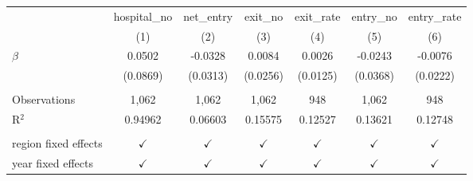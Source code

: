 \begingroup
\centering
\begin{tabular}{lcccccc}
   \toprule
                        & hospital\_no  & net\_entry    & exit\_no      & exit\_rate    & entry\_no     & entry\_rate\\   
                        & (1)           & (2)           & (3)           & (4)           & (5)           & (6)\\  
   \midrule 
   $\beta$              & 0.0502        & -0.0328       & 0.0084        & 0.0026        & -0.0243       & -0.0076\\   
                        & (0.0869)      & (0.0313)      & (0.0256)      & (0.0125)      & (0.0368)      & (0.0222)\\   
    \\
   Observations         & 1,062         & 1,062         & 1,062         & 948           & 1,062         & 948\\  
   R$^2$                & 0.94962       & 0.06603       & 0.15575       & 0.12527       & 0.13621       & 0.12748\\  
    \\
   region fixed effects & $\checkmark$  & $\checkmark$  & $\checkmark$  & $\checkmark$  & $\checkmark$  & $\checkmark$\\   
   year fixed effects   & $\checkmark$  & $\checkmark$  & $\checkmark$  & $\checkmark$  & $\checkmark$  & $\checkmark$\\   
   \bottomrule
\end{tabular}
\par\endgroup
